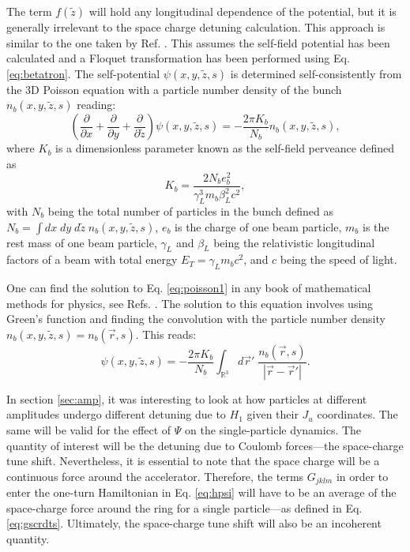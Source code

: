 The term $f(\tilde{z})$ will hold any longitudinal dependence of the potential, but it is generally irrelevant to the space charge detuning calculation. This approach is similar to the one taken by Ref. \cite{scrdt_report}. This assumes the self-field potential has been calculated and a Floquet transformation has been performed using Eq. \ref{eq:betatron}. The self-potential $\psi(x,y,\tilde{z},s)$ is determined self-consistently from the 3D Poisson equation with a particle number density of the bunch $n_b(x,y,\tilde{z},s)$ reading:
\begin{equation}
    \label{eq:poisson1}
    \left( \frac{\partial}{\partial x}+\frac{\partial}{\partial y}+\frac{\partial}{\partial \tilde{z}}\right)\psi (x,y,\tilde{z},s)=-\frac{2 \pi K_b}{N_b}n_b(x,y,\tilde{z},s), 
\end{equation}
where $K_b$ is a dimensionless parameter known as the self-field perveance defined as
\begin{equation}
    \label{eq:perv}
    K_b = \frac{2 N_b e_b^2}{\gamma _L^3 m_b \beta_L^2 c^2},
\end{equation}
with $N_b$ being the total number of particles in the bunch defined as $N_b=\int dx \; dy \; d\tilde{z} \; n_b(x,y,\tilde{z},s)$, $e_b$ is the charge of one beam particle, $m_b$ is the rest mass of one beam particle, $\gamma_L$ and $\beta_L$ being the relativistic longitudinal factors of a beam with total energy $E_T=\gamma_L m_b c^2$, and $c$ being the speed of light.

One can find the solution to Eq. \ref{eq:poisson1} in any book of mathematical methods for physics, see Refs. \cite{arfken,tellez}. The solution to this equation involves using Green's function and finding the convolution with the particle number density $n_b(x,y,\tilde{z},s)=n_b(\vec{r},s)$. This reads:
\begin{equation}
    \label{eq:greens1}
    \psi(x,y,\tilde{z},s)=-\frac{2 \pi K_b}{N_b} \int_{\mathbb{R}^3} d\vec{r}' \; \frac{n_b(\vec{r},s)}{\left| \vec{r}-\vec{r}' \right|}.
\end{equation} 
 
In section \ref{sec:amp}, it was interesting to look at how particles at different amplitudes undergo different detuning due to $H_1$ given their $J_u$ coordinates. The same will be valid for the effect of $\Psi$ on the single-particle dynamics. The quantity of interest will be the detuning due to Coulomb forces---the space-charge tune shift. Nevertheless, it is essential to note that the space charge will be a continuous force around the accelerator. Therefore, the terms $G_{jklm}$ in order to enter the one-turn Hamiltonian in Eq. \ref{eq:hpsi} will have to be an average of the space-charge force around the ring for a single particle---as defined in Eq. \ref{eq:gscrdts}. Ultimately, the space-charge tune shift will also be an incoherent quantity.

